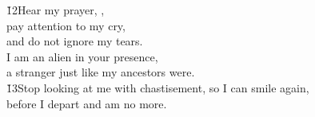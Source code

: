 \begin{poetry}
\poeml \v{12}Hear my prayer, , \\
\poemll    pay attention to my cry, \\
\poemlll       and do not ignore my tears. \\
\poeml I am an alien in your presence, \\
\poemll    a stranger just like my ancestors were. \\
\poeml \v{13}Stop looking at me with chastisement, so I can smile again, \\
\poemll    before I depart and am no more.
\end{poetry}

